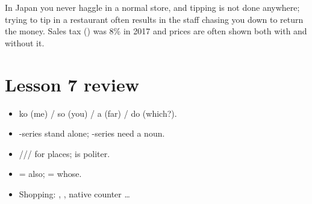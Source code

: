 \begin{aside}
In Japan you never haggle in a normal store, and tipping is not done anywhere; trying to
tip in a restaurant often results in the staff chasing you down to return the money.
Sales tax () was 8\% in 2017 and prices are often shown both with
and without it.
\end{aside}

\section*{Lesson 7 review}
\begin{itemize}
  \item ko (me) / so (you) / a (far) / do (which?).
  \item {}-series stand alone; -series need a noun.
  \item {}/// for places;  is politer.
  \item {} = also;  = whose.
  \item Shopping: , , native counter \ldots
\end{itemize}

